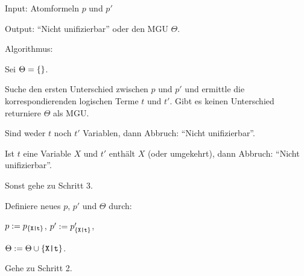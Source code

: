 \begin{algo} \quad
\begin{\whichitem}
\item Input: Atomformeln $p$ und $p'$
\item Output: ``Nicht unifizierbar'' oder den MGU $\Theta$.
\item Algorithmus:
\begin{\whichenum}
\item Sei $\Theta = \left\{\right\}$.
\item Suche den ersten Unterschied zwischen $p$ und $p'$ und ermittle die korrespondierenden
logischen Terme $t$ und $t'$. Gibt es keinen Unterschied returniere $\Theta$ als MGU.
\begin{\whichenum}
\item Sind weder $t$ noch $t'$ Variablen, dann Abbruch: ``Nicht unifizierbar''.
\item Ist $t$ eine Variable $X$ und $t'$ enthält $X$ (oder umgekehrt), dann Abbruch: ``Nicht unifizierbar''.
\item Sonst gehe zu Schritt 3.
\end{\whichenum}
\item Definiere neues $p$, $p'$ und $\Theta$ durch:
\begin{\whichitem}
\item $p := p_{\left\{\texttt{X|t}\right\}}$, $p' := p'_{\left\{\texttt{X|t}\right\}}$,
\item $\Theta := \Theta \cup \left\{\texttt{X|t}\right\}$.
\end{\whichitem}
\item Gehe zu Schritt 2.
\end{\whichenum}
\end{\whichitem}
\end{algo}

